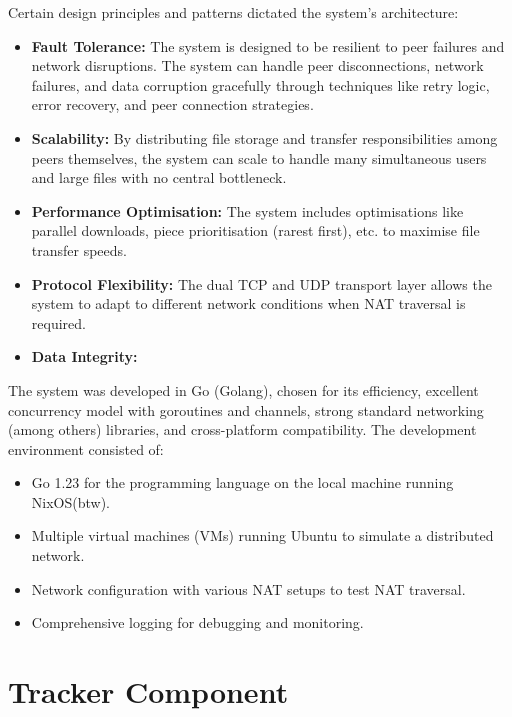 \documentclass[12pt,a4paper]{report}
\begin{document}
Certain design principles and patterns dictated the system's architecture:
\begin{itemize}
	\item \textbf{Fault Tolerance:} The system is designed to be resilient to peer failures and network disruptions. The system can handle peer disconnections, network failures, and data corruption gracefully through techniques like retry logic, error recovery, and peer connection strategies.
	\item \textbf{Scalability:} By distributing file storage and transfer responsibilities among peers themselves, the system can scale to handle many simultaneous users and large files with no central bottleneck.
	\item \textbf{Performance Optimisation:} The system includes optimisations like parallel downloads, piece prioritisation (rarest first), etc. to maximise file transfer speeds.
	\item \textbf{Protocol Flexibility:} The dual TCP and UDP transport layer allows the system to adapt to different network conditions when NAT traversal is required.
	\item \textbf{Data Integrity:} 
\end{itemize}

The system was developed in Go (Golang), chosen for its efficiency, excellent concurrency model with goroutines and channels, strong standard networking (among others) libraries, and cross-platform compatibility. The development environment consisted of:
\begin{itemize}
	\item Go 1.23 for the programming language on the local machine running NixOS(btw).
	\item Multiple virtual machines (VMs) running Ubuntu to simulate a distributed network.
	\item Network configuration with various NAT setups to test NAT traversal.
	\item Comprehensive logging for debugging and monitoring.
\end{itemize}

\section{Tracker Component}
\end{document}
